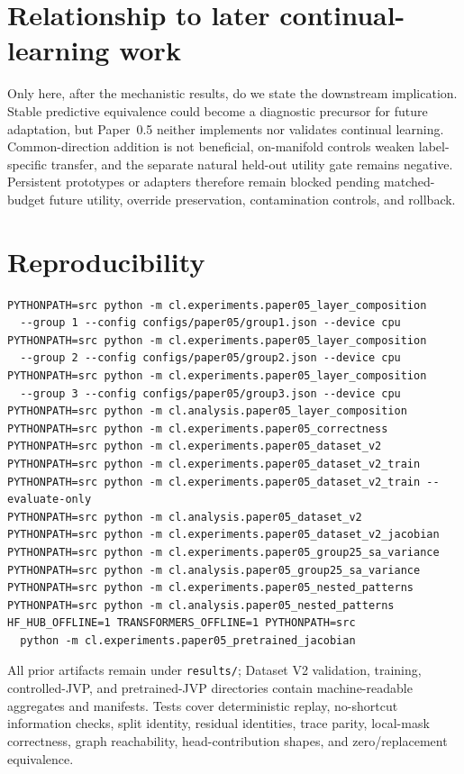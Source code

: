 \documentclass[10pt]{article}
\begin{document}
\section{Relationship to later continual-learning work}
Only here, after the mechanistic results, do we state the downstream implication. Stable predictive equivalence could become a diagnostic precursor for future adaptation, but Paper~0.5 neither implements nor validates continual learning. Common-direction addition is not beneficial, on-manifold controls weaken label-specific transfer, and the separate natural held-out utility gate remains negative. Persistent prototypes or adapters therefore remain blocked pending matched-budget future utility, override preservation, contamination controls, and rollback.

\section{Reproducibility}
\begin{verbatim}
PYTHONPATH=src python -m cl.experiments.paper05_layer_composition
  --group 1 --config configs/paper05/group1.json --device cpu
PYTHONPATH=src python -m cl.experiments.paper05_layer_composition
  --group 2 --config configs/paper05/group2.json --device cpu
PYTHONPATH=src python -m cl.experiments.paper05_layer_composition
  --group 3 --config configs/paper05/group3.json --device cpu
PYTHONPATH=src python -m cl.analysis.paper05_layer_composition
PYTHONPATH=src python -m cl.experiments.paper05_correctness
PYTHONPATH=src python -m cl.experiments.paper05_dataset_v2
PYTHONPATH=src python -m cl.experiments.paper05_dataset_v2_train
PYTHONPATH=src python -m cl.experiments.paper05_dataset_v2_train --evaluate-only
PYTHONPATH=src python -m cl.analysis.paper05_dataset_v2
PYTHONPATH=src python -m cl.experiments.paper05_dataset_v2_jacobian
PYTHONPATH=src python -m cl.experiments.paper05_group25_sa_variance
PYTHONPATH=src python -m cl.analysis.paper05_group25_sa_variance
PYTHONPATH=src python -m cl.experiments.paper05_nested_patterns
PYTHONPATH=src python -m cl.analysis.paper05_nested_patterns
HF_HUB_OFFLINE=1 TRANSFORMERS_OFFLINE=1 PYTHONPATH=src
  python -m cl.experiments.paper05_pretrained_jacobian
\end{verbatim}
All prior artifacts remain under \texttt{results/}; Dataset V2 validation, training, controlled-JVP, and pretrained-JVP directories contain machine-readable aggregates and manifests. Tests cover deterministic replay, no-shortcut information checks, split identity, residual identities, trace parity, local-mask correctness, graph reachability, head-contribution shapes, and zero/replacement equivalence.
\end{document}
